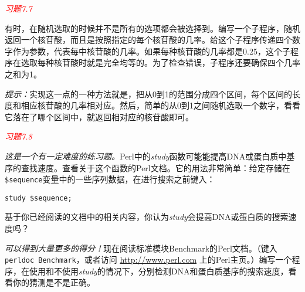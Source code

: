 \textcolor{red}{\textit{习题7.7}}
\begin{adjustwidth}{1cm}{}
有时，在随机选取的时候并不是所有的选项都会被选择到。编写一个子程序，随机返回一个核苷酸，而且是按照指定的每个核苷酸的几率。给这个子程序传递四个数字作为参数，代表每中核苷酸的几率。如果每种核苷酸的几率都是0.25，这个子程序在选取每种核苷酸时就是完全均等的。为了检查错误，子程序还要确保四个几率之和为1。

\textit{提示：}实现这一点的一种方法就是，把从0到1的范围分成四个区间，每个区间的长度和相应核苷酸的几率相对应。然后，简单的从0到1之间随机选取一个数字，看看它落在了哪个区间中，就返回相对应的核苷酸即可。
\end{adjustwidth}

\textcolor{red}{\textit{习题7.8}}
\begin{adjustwidth}{1cm}{}
\textit{这是一个有一定难度的练习题。}Perl中的\textit{study}函数可能能提高DNA或蛋白质中基序的查找速度。查看关于这个函数的Perl文档。它的用法非常简单：给定存储在\verb|$sequence|变量中的一些序列数据，在进行搜索之前键入：

\begin{lstlisting}
study $sequence;
\end{lstlisting}

基于你已经阅读的文档中的相关内容，你认为\textit{study}会提高DNA或蛋白质的搜索速度吗？
\end{adjustwidth}

\textit{可以得到大量更多的得分！}现在阅读标准模块Benchmark的Perl文档。（键入\verb|perldoc Benchmark|，或者访问 \href{http://www.perl.com}{http://www.perl.com} 上的Perl主页。）编写一个程序，在使用和不使用\textit{study}的情况下，分别检测DNA和蛋白质基序的搜索速度，看看你的猜测是不是正确。
